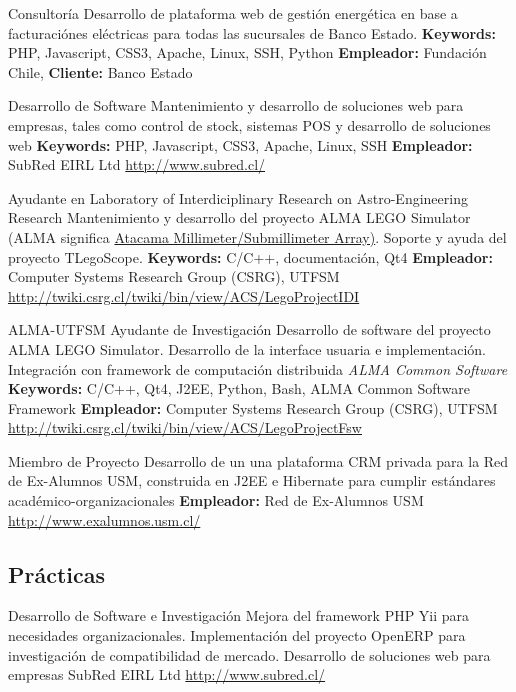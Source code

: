 \documentclass[11pt,a4paper]{moderncv}
\begin{document}
        {Consultoría}
        {Desarrollo de plataforma web de gestión energética en base a facturaciónes eléctricas para todas las sucursales de Banco Estado.}
        {\textbf{Keywords:} PHP, Javascript, CSS3, Apache, Linux, SSH, Python}
        {\textbf{Empleador:} Fundación Chile, \textbf{Cliente:} Banco Estado}
        {}

        {Desarrollo de Software}
        {Mantenimiento y desarrollo de soluciones web para empresas, tales como control de stock, sistemas POS y desarrollo de soluciones web}
        {\textbf{Keywords:} PHP, Javascript, CSS3, Apache, Linux, SSH}
        {\textbf{Empleador:} SubRed EIRL Ltd}
        {\url{http://www.subred.cl/}}

        {Ayudante en Laboratory of Interdiciplinary Research on Astro-Engineering Research}
        {Mantenimiento y desarrollo del proyecto ALMA LEGO Simulator (ALMA significa \href{http://www.alma.cl/}{Atacama Millimeter/Submillimeter Array)}. Soporte y ayuda del proyecto TLegoScope.}
        {\textbf{Keywords:} C/C++, documentación, Qt4}
        {\textbf{Empleador:} Computer Systems Research Group (CSRG), UTFSM}
        {\url{http://twiki.csrg.cl/twiki/bin/view/ACS/LegoProjectIDI}}

        {ALMA-UTFSM Ayudante de Investigación}
        {Desarrollo de software del proyecto ALMA LEGO Simulator. Desarrollo de la interface usuaria e implementación. Integración con framework de computación distribuida \emph{ALMA Common Software}}
        {\textbf{Keywords:} C/C++, Qt4, J2EE, Python, Bash, ALMA Common Software Framework}
        {\textbf{Empleador:} Computer Systems Research Group (CSRG), UTFSM}
        {\url{http://twiki.csrg.cl/twiki/bin/view/ACS/LegoProjectFsw}}

        {Miembro de Proyecto}
        {Desarrollo de un una plataforma CRM privada para la Red de Ex-Alumnos USM, construida en J2EE e Hibernate para cumplir estándares académico-organizacionales}
        {\textbf{Empleador:} Red de Ex-Alumnos USM}
        {}
        {\url{http://www.exalumnos.usm.cl/}}


\subsection{Prácticas}


        {Desarrollo de Software e Investigación}
        {Mejora del framework PHP Yii para necesidades organizacionales. Implementación del proyecto OpenERP para investigación de compatibilidad de mercado. Desarrollo de soluciones web para empresas}
        {SubRed EIRL Ltd}
        {}
        {\url{http://www.subred.cl/}}
\end{document}
